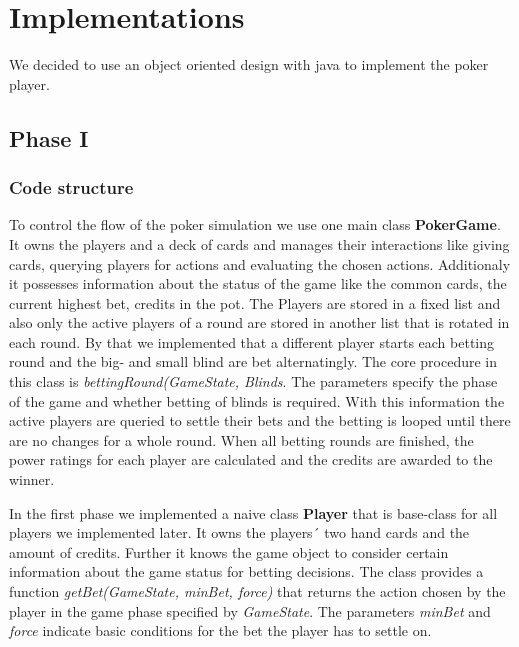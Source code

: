 

\section{Implementations}

We decided to use an object oriented design with java to implement the poker player.

\subsection{Phase I}

\subsubsection{Code structure}

To control the flow of the poker simulation we use one main class \textbf{PokerGame}.
It owns the players and a deck of cards and manages their interactions like giving cards, querying players for actions and evaluating the chosen actions. Additionaly it possesses information about the status of the game like the common cards, the current highest bet, credits in the pot.
The Players are stored in a fixed list and also only the active players of a round are stored in another list that is rotated in each round. By that we implemented that a different player starts each betting round and the big- and small blind are bet alternatingly. The core procedure in this class is \textit{bettingRound(GameState, Blinds}. The parameters specify the phase of the game and whether betting of blinds is required. With this information the active players are queried to settle their bets and the betting is looped until there are no changes for a whole round. When all betting rounds are finished, the power ratings for each player are calculated and the credits are awarded to the winner.

In the first phase we implemented a naive class \textbf{Player} that is base-class for all players we implemented later. It owns the players´ two hand cards and the amount of credits. Further it knows the game object to consider certain information about the game status for betting decisions. The class provides a function \textit{getBet(GameState, minBet, force)} that returns the action chosen by the player in the game phase specified by \textit{GameState}. The parameters \textit{minBet} and \textit{force} indicate basic conditions for the bet the player has to settle on.

